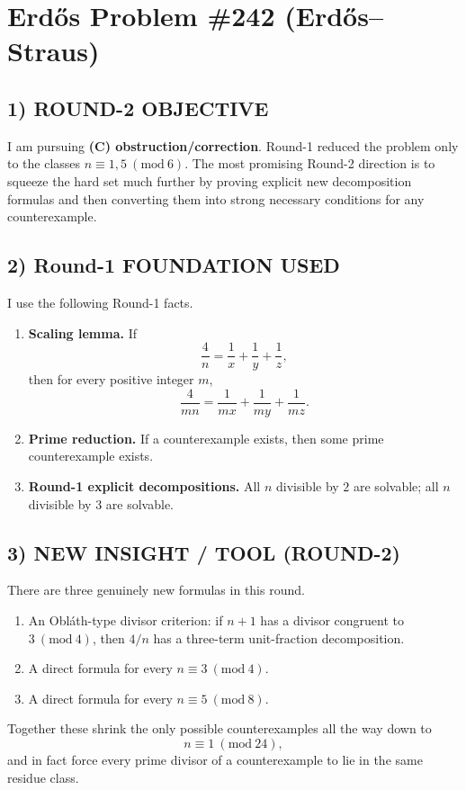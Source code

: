 \section{Erd\H{o}s Problem \#242 (Erd\H{o}s--Straus)}

\subsection*{1) ROUND-2 OBJECTIVE}
I am pursuing \textbf{(C) obstruction/correction}. Round-1 reduced the problem only to the classes $n\equiv 1,5 \ (\mathrm{mod}\ 6)$. The most promising Round-2 direction is to squeeze the hard set much further by proving explicit new decomposition formulas and then converting them into strong necessary conditions for any counterexample.

\subsection*{2) Round-1 FOUNDATION USED}
I use the following Round-1 facts.
\begin{enumerate}
\item \textbf{Scaling lemma.} If
\[
\frac{4}{n}=\frac1x+\frac1y+\frac1z,
\]
then for every positive integer $m$,
\[
\frac{4}{mn}=\frac1{mx}+\frac1{my}+\frac1{mz}.
\]
\item \textbf{Prime reduction.} If a counterexample exists, then some prime counterexample exists.
\item \textbf{Round-1 explicit decompositions.} All $n$ divisible by $2$ are solvable; all $n$ divisible by $3$ are solvable.
\end{enumerate}

\subsection*{3) NEW INSIGHT / TOOL (ROUND-2)}
There are three genuinely new formulas in this round.
\begin{enumerate}
\item An Obl\'ath-type divisor criterion: if $n+1$ has a divisor congruent to $3 \ (\mathrm{mod}\ 4)$, then $4/n$ has a three-term unit-fraction decomposition.
\item A direct formula for every $n\equiv 3 \ (\mathrm{mod}\ 4)$.
\item A direct formula for every $n\equiv 5 \ (\mathrm{mod}\ 8)$.
\end{enumerate}
Together these shrink the only possible counterexamples all the way down to
\[
 n\equiv 1 \ (\mathrm{mod}\ 24),
\]
and in fact force every prime divisor of a counterexample to lie in the same residue class.

